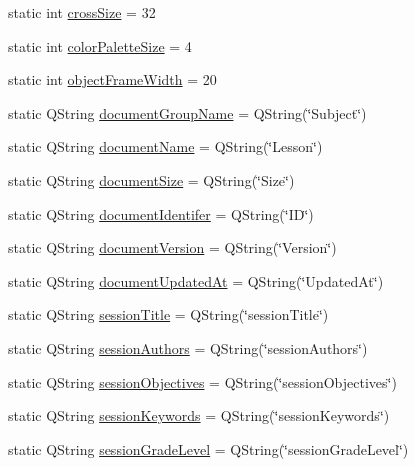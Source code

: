 \begin{DoxyCompactItemize}
\item 
static int \hyperlink{class_u_b_settings_ae97d3bcabc04a1efbad5ff97032790ef}{cross\-Size} = 32
\item 
static int \hyperlink{class_u_b_settings_aa2f5ce1902f84a0717c7322b0bb2af5d}{color\-Palette\-Size} = 4
\item 
static int \hyperlink{class_u_b_settings_a1043e0bbaff0c3e31eb6472d771967a2}{object\-Frame\-Width} = 20
\item 
static Q\-String \hyperlink{class_u_b_settings_a840d7de55a46ac70210981b48afbea68}{document\-Group\-Name} = Q\-String(\char`\"{}Subject\char`\"{})
\item 
static Q\-String \hyperlink{class_u_b_settings_ac835acad66226a9b63347e2ed55fbd13}{document\-Name} = Q\-String(\char`\"{}Lesson\char`\"{})
\item 
static Q\-String \hyperlink{class_u_b_settings_a8b5d0d32779ae922cf795f6455e9385f}{document\-Size} = Q\-String(\char`\"{}Size\char`\"{})
\item 
static Q\-String \hyperlink{class_u_b_settings_ae32d2d0d90f473f448ac9fe0570b25cd}{document\-Identifer} = Q\-String(\char`\"{}I\-D\char`\"{})
\item 
static Q\-String \hyperlink{class_u_b_settings_a944257fa012bc74d251227ea8a6afb99}{document\-Version} = Q\-String(\char`\"{}Version\char`\"{})
\item 
static Q\-String \hyperlink{class_u_b_settings_aa9801d52a997e3a5f20c6ea533074f94}{document\-Updated\-At} = Q\-String(\char`\"{}Updated\-At\char`\"{})
\item 
static Q\-String \hyperlink{class_u_b_settings_a541db9f46c2319a1a9f43052cf338abf}{session\-Title} = Q\-String(\char`\"{}session\-Title\char`\"{})
\item 
static Q\-String \hyperlink{class_u_b_settings_a0b87a7cf69175a342007c69a14b74610}{session\-Authors} = Q\-String(\char`\"{}session\-Authors\char`\"{})
\item 
static Q\-String \hyperlink{class_u_b_settings_a0e8511b43547195f233f69ac7ce7b175}{session\-Objectives} = Q\-String(\char`\"{}session\-Objectives\char`\"{})
\item 
static Q\-String \hyperlink{class_u_b_settings_a2512bb750de3636997d3198fee3648d6}{session\-Keywords} = Q\-String(\char`\"{}session\-Keywords\char`\"{})
\item 
static Q\-String \hyperlink{class_u_b_settings_aa487126d67dbcd67c98fb385fa31a28f}{session\-Grade\-Level} = Q\-String(\char`\"{}session\-Grade\-Level\char`\"{})
\item 

\end{DoxyCompactItemize}
